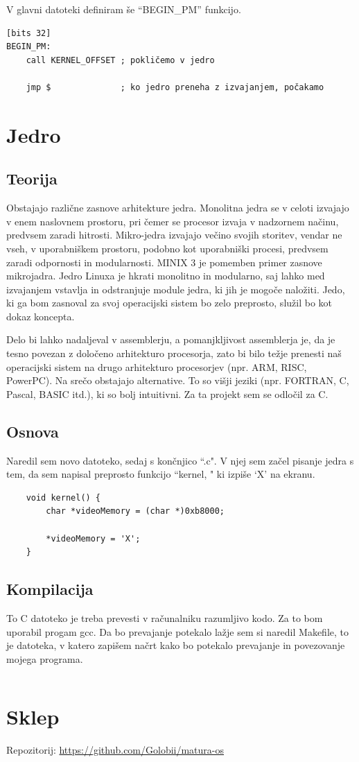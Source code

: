 \documentclass{report}
\begin{document}
V glavni datoteki definiram še ``BEGIN\_PM'' funkcijo.
\begin{verbatim}
[bits 32]
BEGIN_PM:
    call KERNEL_OFFSET ; pokličemo v jedro

    jmp $              ; ko jedro preneha z izvajanjem, počakamo
\end{verbatim}


\chapter{Jedro}

\section{Teorija}
Obstajajo različne zasnove arhitekture jedra. Monolitna jedra se v celoti
izvajajo v enem naslovnem prostoru, pri čemer se procesor izvaja v nadzornem
načinu, predvsem zaradi hitrosti. Mikro-jedra izvajajo večino svojih storitev,
vendar ne vseh, v uporabniškem prostoru, podobno kot uporabniški procesi,
predvsem zaradi odpornosti in modularnosti. MINIX 3 je pomemben primer zasnove
mikrojadra. Jedro Linuxa je hkrati monolitno in modularno, saj lahko med
izvajanjem vstavlja in odstranjuje module jedra, ki jih je mogoče naložiti.
Jedo, ki ga bom zasnoval za svoj operacijski sistem bo zelo preprosto, služil bo
kot dokaz koncepta.

Delo bi lahko nadaljeval v assemblerju, a pomanjkljivost assemblerja je, da je
tesno povezan z določeno arhitekturo procesorja, zato bi bilo težje prenesti
naš operacijski sistem na drugo arhitekturo procesorjev (npr. ARM, RISC, PowerPC).
Na srečo obstajajo alternative. To so višji jeziki (npr. FORTRAN, C, Pascal,
BASIC itd.), ki so bolj intuitivni. Za ta projekt sem se odločil za C. 

\section{Osnova}
Naredil sem novo datoteko, sedaj s končnjico ``.c". V njej sem začel pisanje jedra s tem, da sem
napisal preprosto funkcijo ``kernel, " ki izpiše `X' na ekranu.
    \begin{verbatim}
    void kernel() {
        char *videoMemory = (char *)0xb8000;

        *videoMemory = 'X';
    }
    \end{verbatim}

\section{Kompilacija}
To C datoteko je treba prevesti v računalniku razumljivo kodo. Za to bom uporabil progam gcc.
Da bo prevajanje potekalo lažje sem si naredil Makefile, to je datoteka, v katero zapišem načrt
kako bo potekalo prevajanje in povezovanje mojega programa.
\inputminted{make}{../Makefile}

\chapter{Sklep}
Repozitorij: \url{https://github.com/Golobii/matura-os}

\printbibliography
\end{document}

